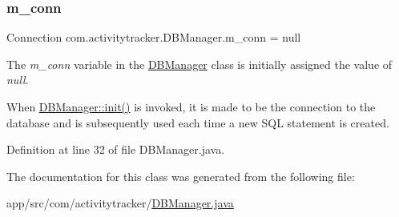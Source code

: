 \subsubsection{\texorpdfstring{m\+\_\+conn}{m\_conn}}
{\footnotesize\ttfamily Connection com.\+activitytracker.\+D\+B\+Manager.\+m\+\_\+conn = null\hspace{0.3cm}{\ttfamily [private]}}

The {\itshape m\+\_\+conn} variable in the \mbox{\hyperlink{classcom_1_1activitytracker_1_1_d_b_manager}{D\+B\+Manager}} class is initially assigned the value of {\itshape null}.

When \mbox{\hyperlink{classcom_1_1activitytracker_1_1_d_b_manager_a41df4600bb5901a26a4ea6a7108a70b9}{D\+B\+Manager\+::init()}} is invoked, it is made to be the connection to the database and is subsequently used each time a new S\+QL statement is created. 

Definition at line 32 of file D\+B\+Manager.\+java.



The documentation for this class was generated from the following file\+:\begin{DoxyCompactItemize}
\item 
app/src/com/activitytracker/\mbox{\hyperlink{_d_b_manager_8java}{D\+B\+Manager.\+java}}\end{DoxyCompactItemize}
